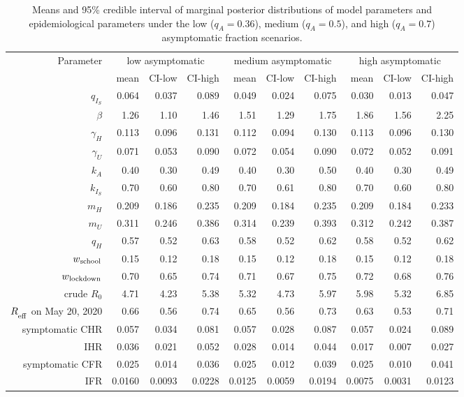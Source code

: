 \documentclass[11pt]{article}
\begin{document}
\begin{table}[!htb]
	\centering
	\caption{Means and 95\% credible interval of marginal posterior distributions of model parameters and epidemiological parameters under the low ($q_A = 0.36$), medium ($q_A = 0.5$), and high ($q_A = 0.7$) asymptomatic fraction scenarios.}
	\vspace{.5em}
	\begin{tabular}{r|rrr|rrr|rrr}
		\toprule
		Parameter & \multicolumn{3}{c}{low asymptomatic} & \multicolumn{3}{c}{medium asymptomatic} & \multicolumn{3}{c}{high asymptomatic} \\
		{} & mean & CI-low & CI-high & mean & CI-low & CI-high & mean & CI-low & CI-high \\ 
		\hline
			$q_{I_S}$ & 0.064 & 0.037 & 0.089 & 0.049 & 0.024 & 0.075 & 0.030 & 0.013 & 0.047 \\ 
			$\beta$ & 1.26 & 1.10 & 1.46 & 1.51 & 1.29 & 1.75 & 1.86 & 1.56 & 2.25 \\ 
			$\gamma_H$ & 0.113 & 0.096 & 0.131 & 0.112 & 0.094 & 0.130 & 0.113 & 0.096 & 0.130 \\ 
			$\gamma_U$ & 0.071 & 0.053 & 0.090 & 0.072 & 0.054 & 0.090 & 0.072 & 0.052 & 0.091 \\ 
			$k_A$ & 0.40 & 0.30 & 0.49 & 0.40 & 0.30 & 0.50 & 0.40 & 0.30 & 0.49 \\ 
			$k_{I_S}$ & 0.70 & 0.60 & 0.80 & 0.70 & 0.61 & 0.80 & 0.70 & 0.60 & 0.80 \\ 
			$m_H$ & 0.209 & 0.186 & 0.235 & 0.209 & 0.184 & 0.235 & 0.209 & 0.184 & 0.233 \\ 
			$m_U$ & 0.311 & 0.246 & 0.386 & 0.314 & 0.239 & 0.393 & 0.312 & 0.242 & 0.387 \\ 
			$q_H$ & 0.57 & 0.52 & 0.63 & 0.58 & 0.52 & 0.62 & 0.58 & 0.52 & 0.62 \\ 
			$w\textsubscript{school}$ & 0.15 & 0.12 & 0.18 & 0.15 & 0.12 & 0.18 & 0.15 & 0.12 & 0.18 \\ 
			$w\textsubscript{lockdown}$ & 0.70 & 0.65 & 0.74 & 0.71 & 0.67 & 0.75 & 0.72 & 0.68 & 0.76 \\ 
			crude $R_0$ & 4.71 & 4.23 & 5.38 & 5.32 & 4.73 & 5.97 & 5.98 & 5.32 & 6.85 \\ 
			$R_\textsubscript{eff}$ on May 20, 2020 & 0.66 & 0.56 & 0.74 & 0.65 & 0.56 & 0.73 & 0.63 & 0.53 & 0.71 \\ 
			symptomatic CHR & 0.057 & 0.034 & 0.081 & 0.057 & 0.028 & 0.087 & 0.057 & 0.024 & 0.089 \\ 
			IHR & 0.036 & 0.021 & 0.052 & 0.028 & 0.014 & 0.044 & 0.017 & 0.007 & 0.027 \\ 
			symptomatic CFR & 0.025 & 0.014 & 0.036 & 0.025 & 0.012 & 0.039 & 0.025 & 0.010 & 0.041 \\ 
			IFR & 0.0160 & 0.0093 & 0.0228 & 0.0125 & 0.0059 & 0.0194 & 0.0075 & 0.0031 & 0.0123 \\ 
		\bottomrule 
	\end{tabular}
	\vspace{0.5em}
	

\end{table}
\end{document}
